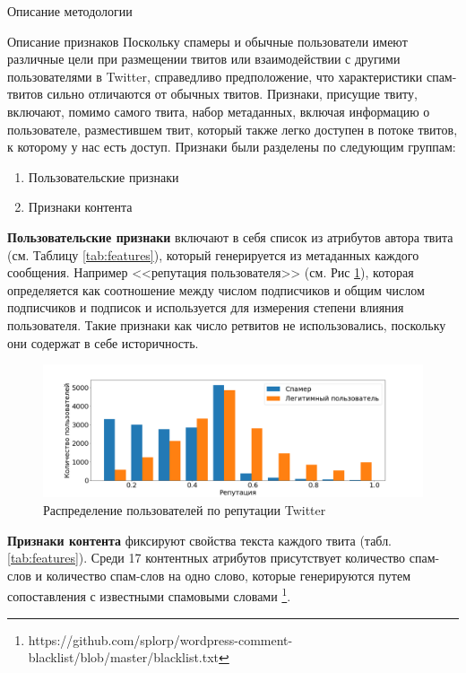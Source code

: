 \begin{section}{Описание методологии}
  \begin{subsection}{Описание признаков}
    Поскольку спамеры и обычные пользователи имеют различные цели при размещении твитов или взаимодействии с другими пользователями в Twitter, справедливо предположение, что характеристики спам-твитов сильно отличаются от обычных твитов.
    Признаки, присущие твиту, включают, помимо самого твита, набор метаданных, включая информацию о пользователе, разместившем твит, который также легко доступен в потоке твитов, к которому у нас есть доступ.
    Признаки были разделены по следующим группам:
    \begin{enumerate}
      \item Пользовательские признаки
      \item Признаки контента
    \end{enumerate}

    \textbf{Пользовательские признаки} включают в себя список из атрибутов автора твита (см. Таблицу \ref{tab:features}), который генерируется из метаданных каждого сообщения. Например <<репутация пользователя>> \cite{Wang} (см. Рис \ref{pic:reputation}), которая определяется как соотношение между числом подписчиков и общим числом подписчиков и подписок и используется для измерения степени влияния пользователя. Такие признаки как число ретвитов не использовались, поскольку они содержат в себе историчность.

    \begin{figure}[ht!]
    \centering
    \includegraphics[width=1.0\textwidth]{pics/reputation}
    \caption{Распределение пользователей по репутации Twitter}
    \label{pic:reputation}
    \end{figure}

    \textbf{Признаки контента} фиксируют свойства текста каждого твита (табл. \ref{tab:features}).
     Среди 17 контентных атрибутов присутствует количество спам-слов и количество спам-слов на одно слово, которые генерируются путем сопоставления с известными спамовыми словами  \footnote{https://github.com/splorp/wordpress-comment-blacklist/blob/master/blacklist.txt}.



\end{subsection}
\end{section}
